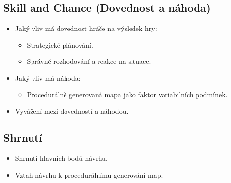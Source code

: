 \subsection{Skill and Chance (Dovednost a náhoda)}
\begin{itemize}
    \item Jaký vliv má dovednost hráče na výsledek hry:
    \begin{itemize}
        \item Strategické plánování.
        \item Správné rozhodování a reakce na situace.
    \end{itemize}
    \item Jaký vliv má náhoda:
    \begin{itemize}
        \item Procedurálně generovaná mapa jako faktor variabilních podmínek.
    \end{itemize}
    \item Vyvážení mezi dovedností a náhodou.
\end{itemize}


\subsection{Shrnutí}
\begin{itemize}
    \item Shrnutí hlavních bodů návrhu.
    \item Vztah návrhu k procedurálnímu generování map.
\end{itemize}
